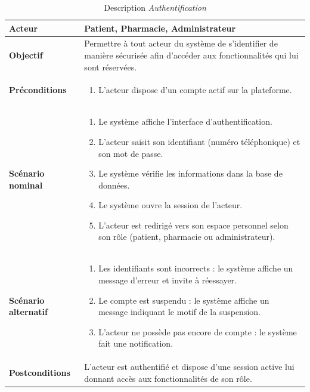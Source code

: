 \documentclass[12pt,a4paper]{report}
\begin{document}
\begin{table}[H]
    \centering
    \begin{tabular}{|p{4cm}|p{9cm}|}
        \hline
        \textbf{Acteur} & Patient, Pharmacie, Administrateur \\
        \hline
        \textbf{Objectif} & Permettre à tout acteur du système de s'identifier de manière sécurisée afin d'accéder aux fonctionnalités qui lui sont réservées. \\
        \hline
        \textbf{Préconditions} &
        \begin{enumerate}
            \item L'acteur dispose d'un compte actif sur la plateforme.
        \end{enumerate} \\
        \hline
        \textbf{Scénario nominal} &
        \begin{enumerate}
            \item Le système affiche l'interface d'authentification.
            \item L'acteur saisit son identifiant (numéro téléphonique) et son mot de passe.
            \item Le système vérifie les informations dans la base de données.
            \item Le système ouvre la session de l'acteur.
            \item L'acteur est redirigé vers son espace personnel selon son rôle (patient, pharmacie ou administrateur).
        \end{enumerate} \\
        \hline
        \textbf{Scénario alternatif} &
        \begin{enumerate}
            \item[3.a] Les identifiants sont incorrects : le système affiche un message d'erreur et invite à réessayer.
            \item[3.b] Le compte est suspendu : le système affiche un message indiquant le motif de la suspension.
            \item[1.a] L'acteur ne possède pas encore de compte : le système fait une notification.
        \end{enumerate} \\
        \hline
        \textbf{Postconditions} & L'acteur est authentifié et dispose d'une session active lui donnant accès aux fonctionnalités de son rôle. \\
        \hline
    \end{tabular}
    \caption{Description \textit{Authentification}}
\end{table}
\end{document}
